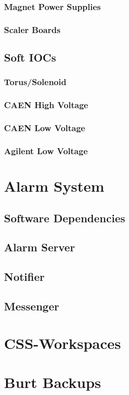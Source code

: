 \documentclass[amsmath,amssymb,notitlepage,11pt]{revtex4}
\begin{document}
\subsubsection{Magnet Power Supplies}
\subsubsection{Scaler Boards}
\subsection{Soft IOCs}
\subsubsection{Torus/Solenoid}
\subsubsection{CAEN High Voltage}
\subsubsection{CAEN Low Voltage}
\subsubsection{Agilent Low Voltage}


\section{Alarm System}
\subsection{Software Dependencies}
\subsection{Alarm Server}
\subsection{Notifier}
\subsection{Messenger}

\section{CSS-Workspaces}

\section{Burt Backups}


%
\end{document}

